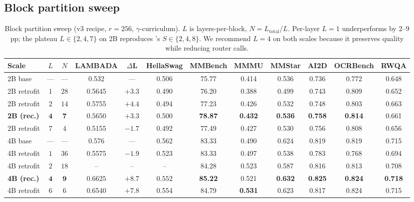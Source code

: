 \documentclass{article}
\begin{document}
\subsection{Block partition sweep}
\label{app:block_partition}
\begin{table}[h]
\caption{Block partition sweep (v3 recipe, $r{=}256$, $\gamma$-curriculum). $L$ is layers-per-block, $N{=}L_{\text{total}}/L$. Per-layer $L{=}1$ underperforms by $2$--$9$pp; the plateau $L\in\{2,4,7\}$ on $2$B reproduces \citet{chen2026attnres}'s $S\in\{2,4,8\}$. We recommend $L{=}4$ on both scales because it preserves quality while reducing router calls.}
\label{tab:block_partition}
\centering\small
\setlength{\tabcolsep}{3pt}
\begin{tabular}{lccccccccccc}
\toprule
Scale & $L$ & $N$ & LAMBADA & $\Delta$L & HellaSwag & MMBench & MMMU & MMStar & AI2D & OCRBench & RWQA \\
\midrule
2B base       & --- & ---  & 0.532  & ---     & 0.506 & 75.77 & 0.414 & 0.536 & 0.736 & 0.772 & 0.648 \\
2B retrofit   & $1$ & $28$ & 0.5645 & $+3.3$  & 0.490 & 76.20 & 0.388 & 0.499 & 0.743 & 0.809 & 0.652 \\
2B retrofit   & $2$ & $14$ & 0.5755 & $+4.4$  & 0.494 & 77.23 & 0.426 & 0.532 & 0.748 & 0.803 & 0.663 \\
\textbf{2B (rec.)} & $\mathbf{4}$ & $\mathbf{7}$  & $\mathbf{0.5650}$ & $\mathbf{+3.3}$  & $\mathbf{0.500}$ & \textbf{78.87} & \textbf{0.432} & \textbf{0.536} & \textbf{0.758} & \textbf{0.814} & 0.661 \\
2B retrofit   & $7$ & $4$  & 0.5155 & $-1.7$  & 0.492 & 77.49 & 0.427 & 0.530 & 0.756 & 0.808 & 0.656 \\
\midrule
4B base       & --- & ---  & 0.576  & ---     & 0.562 & 83.33 & 0.490 & 0.624 & 0.819 & 0.819 & 0.715 \\
4B retrofit   & $1$ & $36$ & 0.5575 & $-1.9$  & 0.523 & 83.33 & 0.497 & 0.538 & 0.783 & 0.768 & 0.694 \\
4B retrofit   & $2$ & $18$ & --     & --      & --    & 84.28 & 0.523 & 0.587 & 0.816 & 0.813 & 0.708 \\
\textbf{4B (rec.)} & $\mathbf{4}$ & $\mathbf{9}$ & $\mathbf{0.6625}$ & $\mathbf{+8.7}$ & $\mathbf{0.552}$ & \textbf{85.22} & 0.521 & \textbf{0.632} & \textbf{0.825} & \textbf{0.824} & \textbf{0.718} \\
4B retrofit   & $6$ & $6$  & 0.6540 & $+7.8$  & 0.554 & 84.79 & \textbf{0.531} & 0.623 & 0.817 & 0.824 & 0.715 \\
\bottomrule
\end{tabular}
\end{table}
\end{document}
